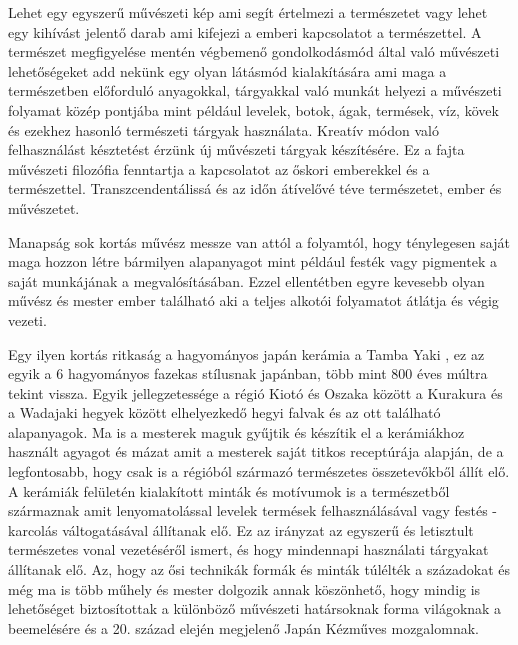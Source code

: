 \documentclass[fontsize=12pt, appendixprefix=true]{scrreprt}
\begin{document}

Lehet egy egyszerű művészeti kép ami segít értelmezi a természetet vagy lehet egy kihívást jelentő darab ami kifejezi a emberi kapcsolatot a természettel.\cite{art_nature} 
A természet megfigyelése mentén végbemenő gondolkodásmód által való művészeti  lehetőségeket  add nekünk egy olyan látásmód kialakítására ami maga a természetben előforduló anyagokkal, tárgyakkal való munkát helyezi a művészeti folyamat közép pontjába mint például levelek, botok, ágak, termések, víz, kövek és ezekhez hasonló természeti tárgyak használata.
Kreatív módon való felhasználást késztetést érzünk új művészeti tárgyak készítésére.
\cite{meller2002textile}
Ez a fajta művészeti filozófia fenntartja a kapcsolatot az őskori emberekkel és a természettel. Transzcendentálissá és az időn átívelővé téve természetet, ember és művészetet.

Manapság sok kortás művész messze van attól a folyamtól, hogy ténylegesen saját maga hozzon létre bármilyen alapanyagot mint például festék vagy pigmentek a saját munkájának a megvalósításában. Ezzel ellentétben egyre kevesebb olyan művész és mester ember található aki a teljes alkotói folyamatot átlátja és végig vezeti.

\vspace{3 mm}
Egy ilyen kortás ritkaság a hagyományos japán kerámia a Tamba Yaki \cite{tambayaki}, ez az  egyik a 6 hagyományos fazekas stílusnak japánban, több mint 800 éves múltra tekint vissza. Egyik jellegzetessége a régió Kiotó és Oszaka között a Kurakura és a Wadajaki hegyek között elhelyezkedő hegyi falvak és az ott található alapanyagok. Ma is a mesterek maguk gyűjtik és készítik el a kerámiákhoz használt agyagot és mázat amit a mesterek saját titkos receptúrája alapján, de a legfontosabb, hogy csak is a régióból származó természetes összetevőkből állít elő. A kerámiák felületén kialakított minták és motívumok is a természetből származnak amit lenyomatolással levelek termések felhasználásával vagy festés - karcolás váltogatásával állítanak elő. Ez az irányzat az egyszerű és letisztult természetes vonal vezetéséről ismert, és hogy mindennapi használati tárgyakat állítanak elő. Az, hogy az ősi technikák formák és minták túlélték  a századokat és még ma is több műhely és mester dolgozik annak köszönhető, hogy mindig is lehetőséget biztosítottak a különböző művészeti határsoknak forma világoknak a beemelésére és a 20. század elején megjelenő Japán Kézműves mozgalomnak.
\end{document}
